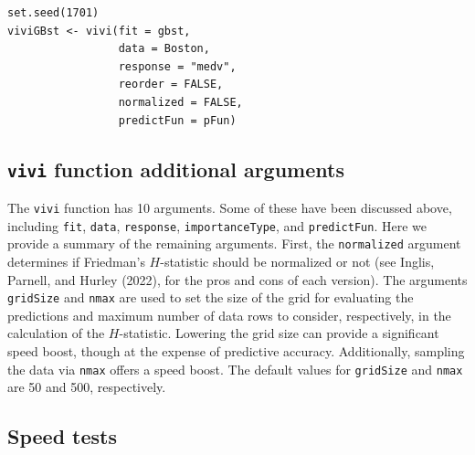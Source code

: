 \begin{verbatim}
set.seed(1701) 
viviGBst <- vivi(fit = gbst,
                 data = Boston,
                 response = "medv",
                 reorder = FALSE,
                 normalized = FALSE,
                 predictFun = pFun)
\end{verbatim}

\hypertarget{sec:vivimatarg}{%
\subsection{\texorpdfstring{\texttt{vivi} function additional arguments}{vivi function additional arguments}}\label{sec:vivimatarg}}

The \texttt{vivi} function has 10 arguments. Some of these have been discussed above, including \texttt{fit}, \texttt{data}, \texttt{response}, \texttt{importanceType}, and \texttt{predictFun}. Here we provide a summary of the remaining arguments. First, the \texttt{normalized} argument determines if Friedman's \(H\)-statistic should be normalized or not (see Inglis, Parnell, and Hurley (2022), for the pros and cons of each version). The arguments \texttt{gridSize} and \texttt{nmax} are used to set the size of the grid for evaluating the predictions and maximum number of data rows to consider, respectively, in the calculation of the \(H\)-statistic. Lowering the grid size can provide a significant speed boost, though at the expense of predictive accuracy. Additionally, sampling the data via \texttt{nmax} offers a speed boost. The default values for \texttt{gridSize} and \texttt{nmax} are 50 and 500, respectively.

\hypertarget{sec:speed}{%
\subsection{Speed tests}\label{sec:speed}}

